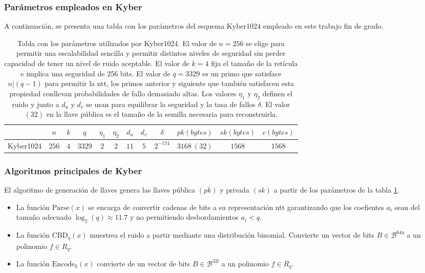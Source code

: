 \subsubsection{Parámetros empleados en Kyber}
A continuación, se presenta una tabla con los parámetros del esquema Kyber1024 empleado en este trabajo fin de grado.
\begin{table}[h]
	\centering
	\renewcommand{\arraystretch}{1.2}
	\begin{tabular}{lccccccccccc}
		\hline
		&\(n\)&\(k\)&\(q\)&\(\eta_1\)&\(\eta_2\)&\(d_u\)&\(d_v\)&\(\delta\)&\(pk (bytes)\)&\(sk (bytes)\)&\(c (bytes)\)\\
		\hline
		Kyber1024&\(256\)&\(4\)&\(3329\)&\(2\)&\(2\)&\(11\)&\(5\)&\(2^{-174}\)&\(3168 \ (32)\)&\(1568\)&\(1568\)\\
		\hline
	\end{tabular}
	\caption{Tabla con los parámetros utilizados por Kyber1024. El valor de \(n=256\) se elige para permitir una escalabilidad sencilla y permitir distintos niveles de seguridad sin perder capacidad de tener un nivel de ruido aceptable. El valor de \(k=4\) fija el tamaño de la retícula e implica una seguridad de 256 bits. El valor de \(q=3329\) es un primo que satisface \(n|(q-1)\) para permitir la \acrshort{ntt}, los primos anterior y siguiente que también satisfacen esta propiedad conllevan probabilidades de fallo demasiado altas. Los valores $\eta_1$ y $\eta_2$ definen el ruido y junto a \(d_u\) y \(d_v\) se usan para equilibrar la seguridad y la tasa de fallos $\delta$. El valor \((32)\) en la llave pública es el tamaño de la semilla necesaria para reconstruirla.}
	\label{tab:KyberParams}
\end{table}

\subsubsection{Algoritmos principales de Kyber \cite{kyber-spec-2021}}
\label{sub:kybAlg}
El algoritmo de generación de llaves genera las llaves pública \((pk)\) y privada \((sk)\) a partir de los parámetros de la tabla \ref{tab:KyberParams}.

\begin{itemize}
	\item La función $\text{Parse}(x)$ se encarga de convertir cadenas de bits a su representación \acrshort{ntt} garantizando que los coefientes \(a_i\) sean del tamaño adecuado \(\log_2(q)\approx 11.7\) y no permitiendo desbordamientos \(a_i<q\).
	\item La función $\text{CBD}_\eta(x)$ muestrea el ruido a partir mediante una distribución binomial. Convierte un vector de bits \(B\in\mathcal{B}^{64\eta}\) a un polinomio \(f\in R_q\).
	\item La función $\text{Encode}_k(x)$ convierte de un vector de bits \(B\in\mathcal{B}^{32l}\) a un polinomio \(f\in R_q\).
\end{itemize}
   \newpage

